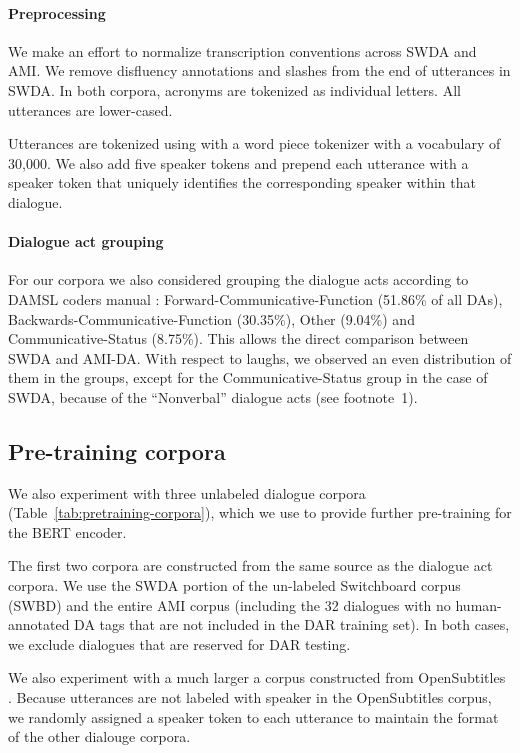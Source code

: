 \documentclass[11pt,a4paper]{article}
\begin{document}
\paragraph{Preprocessing}

We make an effort to normalize transcription conventions across SWDA and AMI.
We remove disfluency annotations and slashes from the end of utterances in SWDA.
In both corpora, acronyms are tokenized as individual letters. 
All utterances are lower-cased.

Utterances are tokenized using with a word piece tokenizer \citep{Wu2016} with a vocabulary of 30,000.
We also add five speaker tokens and prepend each utterance with a speaker token that uniquely identifies the corresponding speaker within that dialogue.

\paragraph{Dialogue act grouping}
For our corpora we also considered grouping the dialogue acts according to DAMSL coders manual \citep{jurafskySwitchboardSWBDDAMSLShallowDiscourseFunction1997a}: Forward-Communicative-Function (51.86\% of all DAs), Backwards-Communicative-Function (30.35\%), Other (9.04\%) and Communicative-Status (8.75\%).
This allows the direct comparison between SWDA and AMI-DA.
With respect to laughs, we observed an even distribution of them in the groups, except for the Communicative-Status group in the case of SWDA, because of the ``Nonverbal'' dialogue acts (see footnote~1).

\subsection{Pre-training corpora}

We also experiment with three unlabeled dialogue corpora (Table~\ref{tab:pretraining-corpora}), which we use to provide further pre-training for the BERT encoder.

The first two corpora are constructed from the same source as the dialogue act corpora.
We use the SWDA portion of the un-labeled Switchboard corpus (SWBD) and the entire AMI corpus (including the 32 dialogues with no human-annotated DA tags that are not included in the DAR training set).
In both cases, we exclude dialogues that are reserved for DAR testing.

We also experiment with a much larger a corpus constructed from OpenSubtitles \citep{Lison2016}.
Because utterances are not labeled with speaker in the OpenSubtitles corpus, we randomly assigned a speaker token to each utterance to maintain the format of the other dialouge corpora.
\end{document}
